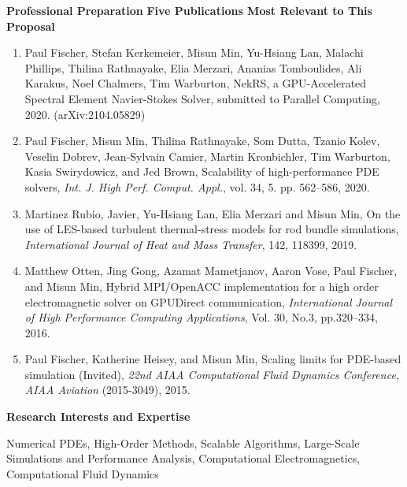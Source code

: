 \documentclass[11pt,letterpaper,english]{article}
\begin{document}
\begin{flushleft} {\bf Professional Preparation}
\vspace{.04in}
{\bf Five Publications Most Relevant to This Proposal}
\vspace{-6pt}
\begin{enumerate} \itemsep1pt \parskip0pt 
\item
  Paul Fischer, Stefan Kerkemeier, Misun Min, Yu-Hsiang Lan, Malachi Phillips, Thilina Rathnayake, Elia Merzari, 
  Ananias Tomboulides, Ali Karakus, Noel Chalmers, Tim Warburton,
  NekRS, a GPU-Accelerated Spectral Element Navier-Stokes Solver,
  submitted to Parallel Computing, 2020. (arXiv:2104.05829)\\
\item Paul Fischer, Misun Min, Thilina Rathnayake, Som Dutta, Tzanio Kolev, Veselin
  Dobrev, Jean-Sylvain Camier, Martin Kronbichler, Tim Warburton, Kasia
  Swirydowicz, and Jed Brown, Scalability of high-performance PDE solvers,
  \textit{Int. J. High Perf. Comput. Appl.}, vol. 34, 5. pp. 562--586, 2020. \\
\item Martinez Rubio, Javier, Yu-Hsiang Lan, Elia Merzari and Misun Min,
On the use of LES-based turbulent thermal-stress models for rod bundle simulations,
\textit{International Journal of Heat and Mass Transfer}, 142, 118399, 2019. \\
\item Matthew Otten, Jing Gong, Azamat Mametjanov, Aaron Vose, Paul Fischer, and Misun Min,
Hybrid MPI/OpenACC implementation for a high order electromagnetic solver on GPUDirect communication,
\textit{International Journal of High Performance Computing Applications}, Vol. 30, No.3, pp.320--334, 2016.\\
\item Paul Fischer, Katherine Heisey, and Misun Min, Scaling limits for PDE-based simulation (Invited),
\textit{22nd AIAA Computational Fluid Dynamics Conference, AIAA Aviation} (2015-3049), 2015.
\end{enumerate}

\vspace{-6pt}
{\bf Research Interests and Expertise}
{\parindent 16pt

Numerical PDEs, High-Order Methods, 
Scalable Algorithms,
Large-Scale Simulations and Performance Analysis, 
Computational Electromagnetics, Computational Fluid Dynamics
}


\end{flushleft}
\end{document}
